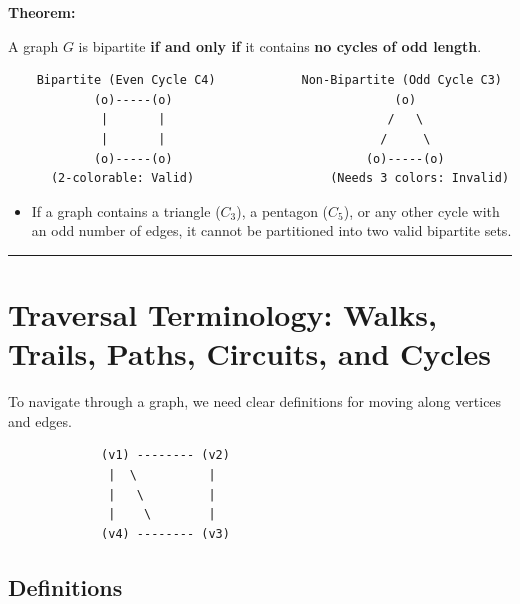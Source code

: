 \documentclass[
]{book}
\providecommand{\tightlist}{%
  \setlength{\itemsep}{0pt}\setlength{\parskip}{0pt}}
\theoremstyle{definition}
\theoremstyle{definition}
\theoremstyle{definition}
\theoremstyle{definition}
\theoremstyle{remark}
\begin{document}
\textbf{Theorem:}

A graph \(G\) is bipartite \textbf{if and only if} it contains \textbf{no cycles of odd length}.

\begin{verbatim}
    Bipartite (Even Cycle C4)            Non-Bipartite (Odd Cycle C3)
            (o)-----(o)                               (o)
             |       |                               /   \
             |       |                              /     \
            (o)-----(o)                           (o)-----(o)
      (2-colorable: Valid)                   (Needs 3 colors: Invalid)
\end{verbatim}

\begin{itemize}
\tightlist
\item
  If a graph contains a triangle (\(C_3\)), a pentagon (\(C_5\)), or any other cycle with an odd number of edges, it cannot be partitioned into two valid bipartite sets.
\end{itemize}

\begin{center}\rule{0.5\linewidth}{0.5pt}\end{center}

\section{Traversal Terminology: Walks, Trails, Paths, Circuits, and Cycles}\label{traversal-terminology-walks-trails-paths-circuits-and-cycles}

To navigate through a graph, we need clear definitions for moving along vertices and edges.

\begin{verbatim}
             (v1) -------- (v2)
              |  \          |
              |   \         |
              |    \        |
             (v4) -------- (v3)
\end{verbatim}

\subsection{Definitions}\label{definitions}
\end{document}
